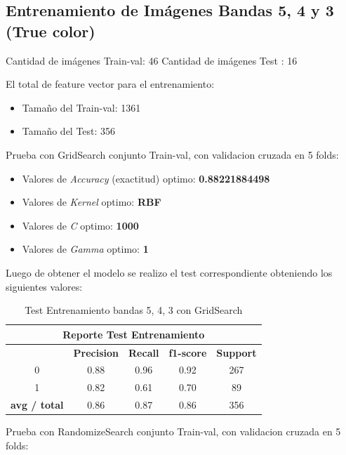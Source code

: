 \subsection{Entrenamiento de Imágenes Bandas 5, 4 y 3 (True color)}\label{sub:entrenamiento_bandas543}

Cantidad de imágenes Train-val: 46 
Cantidad de imágenes Test : 16  

El total de feature vector para el entrenamiento:
\begin{itemize}
\item Tamaño del Train-val: 1361
\item Tamaño del Test: 356
\end{itemize}

Prueba con GridSearch conjunto Train-val, con validacion cruzada en 5 folds:

\begin{itemize}
\item Valores de \textit{Accuracy} (exactitud) optimo: \textbf{0.88221884498}
\item Valores de \textit{Kernel} optimo: \textbf{RBF}
\item Valores de \textit{C} optimo: \textbf{1000}
\item Valores de \textit{Gamma} optimo: \textbf{1}

\end{itemize}

Luego de obtener el modelo se realizo el test correspondiente obteniendo los siguientes valores:
\begin{table}[H]
\begin{center}
\begin{tabular}{|c|c|c|c|c|}
\hline \multicolumn{5}{|c|}{Reporte Test Entrenamiento} \\ \hline
\hline \textbf{} & \textbf{Precision} & \textbf{Recall} & \textbf{f1-score} & \textbf{Support}\\ \hline 
				 0   & 0.88 & 0.96 & 0.92  & 267	\\ \hline 
				 1   & 0.82 & 0.61 & 0.70  & 89 \\ \hline 
\textbf{avg / total} & 0.86 & 0.87 & 0.86  & 356 \\ \hline
\end{tabular}
\end{center} \caption{Test Entrenamiento bandas 5, 4, 3 con GridSearch}\label{tab:gridsearchtest543}
\end{table}


Prueba con RandomizeSearch conjunto Train-val, con validacion cruzada en 5 folds:

